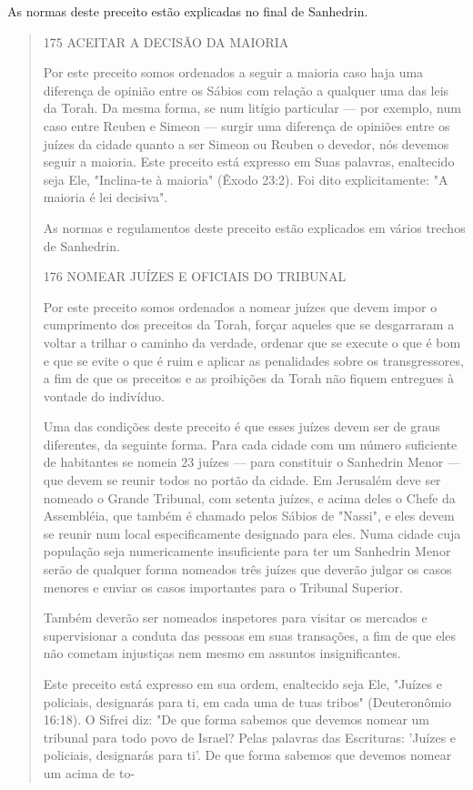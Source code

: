 As normas deste preceito estão explicadas no final de Sanhedrin.

\begin{quote}
175 ACEITAR A DECISÃO DA MAIORIA

Por este preceito somos ordenados a seguir a maioria caso haja uma
diferença de opinião entre os Sábios com relação a qualquer uma das leis
da Torah. Da mesma forma, se num litígio particular --- por exemplo, num
caso entre Reuben e Simeon --- surgir uma diferença de opiniões entre os
juízes da cidade quanto a ser Simeon ou Reuben o devedor, nós devemos
seguir a maio­ria. Este preceito está expresso em Suas palavras,
enaltecido seja Ele, "Inclina-te à maioria" (Êxodo 23:2). Foi dito
explicitamente: "A maioria é lei decisiva".

As normas e regulamentos deste preceito estão explicados em vá­rios
trechos de Sanhedrin.

176 NOMEAR JUÍZES E OFICIAIS DO TRIBUNAL

Por este preceito somos ordenados a nomear juízes que devem im­por o
cumprimento dos preceitos da Torah, forçar aqueles que se desgarraram a
voltar a trilhar o caminho da verdade, ordenar que se execute o que é
bom e que se evite o que é ruim e aplicar as penalidades sobre os
transgressores, a fim de que os preceitos e as proibições da Torah não
fiquem entregues à von­tade do indivíduo.

Uma das condições deste preceito é que esses juízes devem ser de graus
diferentes, da seguinte forma. Para cada cidade com um número
suficien­te de habitantes se nomeia 23 juízes --- para constituir o
Sanhedrin Menor ---que devem se reunir todos no portão da cidade. Em
Jerusalém deve ser nomea­do o Grande Tribunal, com setenta juízes, e
acima deles o Chefe da Assembléia, que também é chamado pelos Sábios de
"Nassi", e eles devem se reunir num local especificamente designado para
eles. Numa cidade cuja população seja nu­mericamente insuficiente para
ter um Sanhedrin Menor serão de qualquer for­ma nomeados três juízes que
deverão julgar os casos menores e enviar os casos importantes para o
Tribunal Superior.

Também deverão ser nomeados inspetores para visitar os mercados e
supervisionar a conduta das pessoas em suas transações, a fim de que
eles não cometam injustiças nem mesmo em assuntos insignificantes.

Este preceito está expresso em sua ordem, enaltecido seja Ele, "Juí­zes
e policiais, designarás para ti, em cada uma de tuas tribos"
(Deuteronômio 16:18). O Sifrei diz: "De que forma sabemos que devemos
nomear um tribunal para todo povo de Israel? Pelas palavras das
Escrituras: 'Juízes e policiais, desig­narás para ti'. De que forma
sabemos que devemos nomear um acima de to-


\end{quote}
